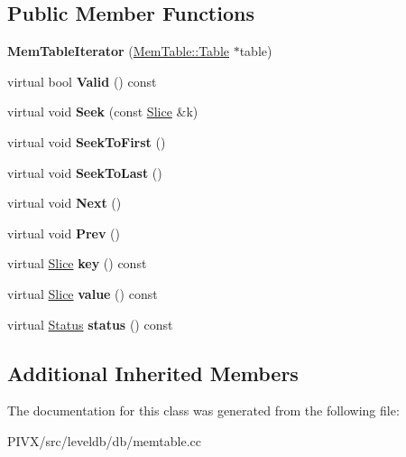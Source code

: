 \subsection*{Public Member Functions}
\begin{DoxyCompactItemize}
\item 
\mbox{\label{classleveldb_1_1_mem_table_iterator_a3cf243a6e8166d55ce87081f69a5ecd7}} 
{\bfseries Mem\+Table\+Iterator} (\mbox{\hyperlink{classleveldb_1_1_skip_list}{Mem\+Table\+::\+Table}} $\ast$table)
\item 
\mbox{\label{classleveldb_1_1_mem_table_iterator_ab991decbbda3c3c76dbc1e3cce446b90}} 
virtual bool {\bfseries Valid} () const
\item 
\mbox{\label{classleveldb_1_1_mem_table_iterator_a140f9575286994337de9b49ea7fe62cb}} 
virtual void {\bfseries Seek} (const \mbox{\hyperlink{classleveldb_1_1_slice}{Slice}} \&k)
\item 
\mbox{\label{classleveldb_1_1_mem_table_iterator_a72eaf5c1bcb6d513f71d4edcb8db3f98}} 
virtual void {\bfseries Seek\+To\+First} ()
\item 
\mbox{\label{classleveldb_1_1_mem_table_iterator_aaed044dc887a51c924086f2a2844a5f0}} 
virtual void {\bfseries Seek\+To\+Last} ()
\item 
\mbox{\label{classleveldb_1_1_mem_table_iterator_a8ce5457cf61b989ce1ceec80084f891c}} 
virtual void {\bfseries Next} ()
\item 
\mbox{\label{classleveldb_1_1_mem_table_iterator_a61f8a385b268158a1e7bd0cba29a83c1}} 
virtual void {\bfseries Prev} ()
\item 
\mbox{\label{classleveldb_1_1_mem_table_iterator_a6044613338dfb547fc5148e4b6461d15}} 
virtual \mbox{\hyperlink{classleveldb_1_1_slice}{Slice}} {\bfseries key} () const
\item 
\mbox{\label{classleveldb_1_1_mem_table_iterator_a6c2907c8c87d2b2933adcd5f0e01f781}} 
virtual \mbox{\hyperlink{classleveldb_1_1_slice}{Slice}} {\bfseries value} () const
\item 
\mbox{\label{classleveldb_1_1_mem_table_iterator_af9bc5f041cd319cfb44408d6bf5aa4a2}} 
virtual \mbox{\hyperlink{classleveldb_1_1_status}{Status}} {\bfseries status} () const
\end{DoxyCompactItemize}
\subsection*{Additional Inherited Members}


The documentation for this class was generated from the following file\+:\begin{DoxyCompactItemize}
\item 
P\+I\+V\+X/src/leveldb/db/memtable.\+cc\end{DoxyCompactItemize}
